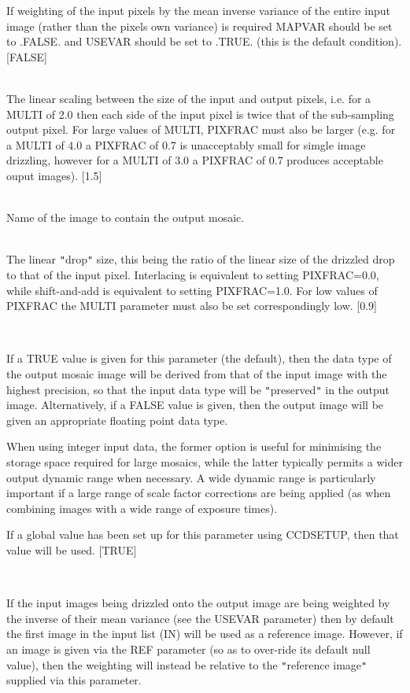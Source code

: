 \documentclass[twoside,11pt]{article}
\renewcommand{\_}{\texttt{\symbol{95}}}
\newcommand{\sstsubsection}[1]{ \item[{#1}] \mbox{} \\}
\newcommand{\sstsubsection}[1]{\item[{#1}]}
\begin{document}
{{{         If weighting of the input pixels by the mean inverse variance
         of the entire input image (rather than the pixels own variance)
         is required MAPVAR should be set to .FALSE. and USEVAR should
         be set to .TRUE. (this is the default condition).
         [FALSE]
      }
      \sstsubsection{
         MULTI = \_DOUBLE (Read)
      }{
         The linear scaling between the size of the input and output
         pixels, i.e. for a MULTI of 2.0 then each side of the input
         pixel is twice that of the sub-sampling output pixel. For large
         values of MULTI, PIXFRAC must also be larger (e.g. for a MULTI
         of 4.0 a PIXFRAC of 0.7 is unacceptably small for simgle image
         drizzling, however for a MULTI of 3.0 a PIXFRAC of 0.7 produces
         acceptable ouput images).
         [1.5]
      }
      \sstsubsection{
         OUT = NDF (Write)
      }{
         Name of the image to contain the output mosaic.
      }
      \sstsubsection{
         PIXFRAC = \_DOUBLE (Read)
      }{
         The linear {\tt "}drop{\tt "} size, this being the ratio of the linear
         size of the drizzled drop to that of the input pixel. Interlacing
         is equivalent to setting PIXFRAC=0.0, while shift-and-add is
         equivalent to setting PIXFRAC=1.0. For low values of PIXFRAC the
         MULTI parameter must also be set correspondingly low.
         [0.9]
      }
      \sstsubsection{
         PRESERVE = \_LOGICAL (Read)
      }{
         If a TRUE value is given for this parameter (the default),
         then the data type of the output mosaic image will be derived
         from that of the input image with the highest precision, so that
         the input data type will be {\tt "}preserved{\tt "} in the output image.
         Alternatively, if a FALSE value is given, then the output image
         will be given an appropriate floating point data type.

         When using integer input data, the former option is useful for
         minimising the storage space required for large mosaics, while
         the latter typically permits a wider output dynamic range when
         necessary. A wide dynamic range is particularly important if a
         large range of scale factor corrections are being applied (as
         when combining images with a wide range of exposure times).

         If a global value has been set up for this parameter using
         CCDSETUP, then that value will be used.
         [TRUE]
      }
      \sstsubsection{
         REF = NDF (Read)
      }{
         If the input images being drizzled onto the output image are being
         weighted by the inverse of their mean variance (see the USEVAR
         parameter) then by default the first image in the input
         list (IN) will be used as a reference image. However, if an image
         is given via the REF parameter (so as to over-ride its default
         null value), then the weighting will instead be relative to
         the {\tt "}reference image{\tt "} supplied via this parameter.

}}}
\end{document}
